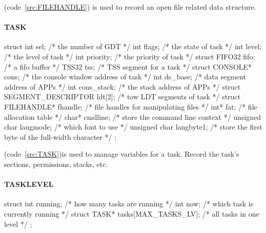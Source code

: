 \documentclass{swfcthesis}
\begin{document}
(code~\ref{src:FILEHANDLE}) is used to record an open file related data structure.



\paragraph{TASK}

\begin{listing}[H]
  \begin{codeblock}
\begin{ccode}
struct 
{ 
  int sel;                          /* the number of GDT */
  int flags;                        /* the state of task */
  int level;                        /* the level of task */
  int priority;                     /* the priority of task */
  struct FIFO32 fifo;               /* a fifo buffer */
  TSS32 tss;                        /* TSS segment for a task */
  struct CONSOLE* cons;             /* the console window address of task */
  int ds_base;                      /* data segment address of APPs */
  int cons_stack;                   /* the stack address of APPs */
  struct SEGMENT_DESCRIPTOR ldt[2]; /* tow LDT segments of task */
  struct FILEHANDLE* fhandle;       /* file handles for manipulating files */
  int* fat;                         /* file allocation table */
  char* cmdline;                    /* store the command line context */
  unsigned char langmode;           /* which font to use */
  unsigned char langbyte1;          /* store the first byte of the full-width character */
};
\end{ccode}
  \end{codeblock}
  \caption{\emph{struct TASK}}\label{src:TASK}
\end{listing}

(code~\ref{src:TASK})is used to manage variables for a task. Record the task's sections,
permissions, stacks, etc.


\paragraph{TASKLEVEL}

\begin{listing}[H]
  \begin{codeblock}
\begin{ccode}
struct 
{ 
  int running;                      /* how many tasks are running */
  int now;                          /* which task is currently running */
  struct TASK* tasks[MAX_TASKS_LV]; /* all tasks in one level */
};
\end{ccode}
  \end{codeblock}
  \caption{\emph{struct TASKLEVEL}}\label{src:TASKLEV}
\end{listing}
\end{document}
